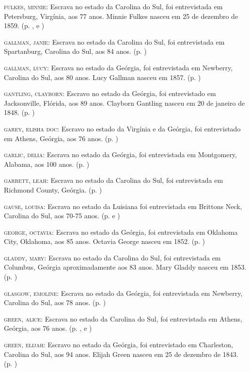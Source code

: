 \begin{Parskip}
\textsc{fulkes, minnie:} Escrava no estado da Carolina do Sul, foi
entrevistada em Petersburg, Virgínia, aos 77 anos. Minnie Fulkes nasceu
em 25 de dezembro de 1859. (p. \pageref{ref94}, \pageref{ref95} e \pageref{ref96})

\textsc{gallman, janie:} Escrava no estado da Carolina do Sul, foi
entrevistada em Spartanburg, Carolina do Sul, aos 84 anos. (p. \pageref{ref97})

\textsc{gallman, lucy:} Escrava no estado da Geórgia, foi entrevistada
em Newberry, Carolina do Sul, aos 80 anos. Lucy Gallman nasceu em 1857. (p. \pageref{ref98})

\textsc{gantling, clayborn:} Escravo no estado da Geórgia, foi
entrevistado em Jacksonville, Flórida, aos 89 anos. Clayborn Gantling
nasceu em 20 de janeiro de 1848. (p. \pageref{ref99})

\textsc{garey, elisha doc:} Escravo no estado da Virgínia e da Geórgia,
foi entrevistado em Athens, Geórgia, aos 76 anos. (p. \pageref{ref100})

\textsc{garlic, delia:} Escrava no estado da Geórgia, foi entrevistada
em Montgomery, Alabama, aos 100 anos. (p. \pageref{ref101})

\textsc{garrett, leah:} Escrava no estado da Carolina do Sul, foi
entrevistada em Richmond County, Geórgia. (p. \pageref{ref102})

\textsc{gause, louisa:} Escrava no estado da Luisiana foi entrevistada
em Brittons Neck, Carolina do Sul, aos 70-75 anos. (p. \pageref{ref103} e \pageref{ref104})

\textsc{george, octavia:} Escrava no estado da Geórgia, foi entrevistada
em Oklahoma City, Oklahoma, aos 85 anos. Octavia George nasceu em 1852. (p. \pageref{ref105})

\textsc{gladdy, mary:} Escrava no estado da Carolina do Sul, foi
entrevistada em Columbus, Geórgia aproximadamente aos 83 anos. Mary
Gladdy nasceu em 1853. (p. \pageref{ref106})

\textsc{glasgow, emoline:} Escrava no estado da Geórgia, foi
entrevistada em Newberry, Carolina do Sul, aos 78 anos. (p. \pageref{ref107})

\textsc{green, alice:} Escrava no estado da Carolina do Sul, foi
entrevistada em Athens, Geórgia, aos 76 anos. (p. \pageref{ref108}, \pageref{ref109} e \pageref{ref110})

\textsc{green, elijah:} Escravo no estado da Geórgia, foi entrevistado
em Charleston, Carolina do Sul, aos 94 anos. Elijah Green nasceu em 25
de dezembro de 1843. (p. \pageref{ref111})


\end{Parskip}
